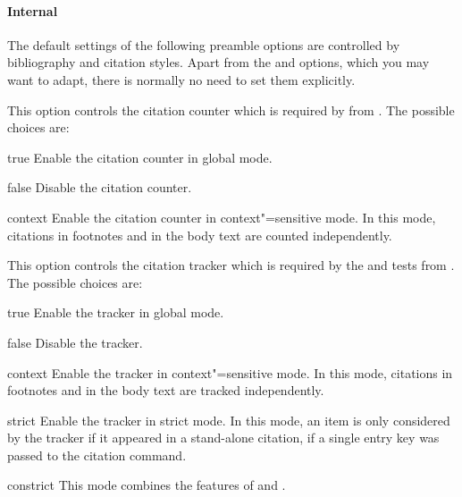 \documentclass{ltxdockit}[2011/03/25]
\begin{document}
\paragraph{Internal}
\label{use:opt:pre:int}

The default settings of the following preamble options are controlled by bibliography and citation styles. Apart from the  and  options, which you may want to adapt, there is normally no need to set them explicitly.

\begin{optionlist}


This option controls the citation counter which is required by  from . The possible choices are:

\begin{valuelist}
\item[true] Enable the citation counter in global mode.
\item[false] Disable the citation counter.
\item[context] Enable the citation counter in context"=sensitive mode. In this mode, citations in footnotes and in the body text are counted independently.
\end{valuelist}


This option controls the citation tracker which is required by the  and  tests from . The possible choices are:

\begin{valuelist}
\item[true] Enable the tracker in global mode.
\item[false] Disable the tracker.
\item[context] Enable the tracker in context"=sensitive mode. In this mode, citations in footnotes and in the body text are tracked independently.
\item[strict] Enable the tracker in strict mode. In this mode, an item is only considered by the tracker if it appeared in a stand-alone citation, \ie if a single entry key was passed to the citation command.
\item[constrict] This mode combines the features of  and .
\end{valuelist}


\end{optionlist}
\end{document}
